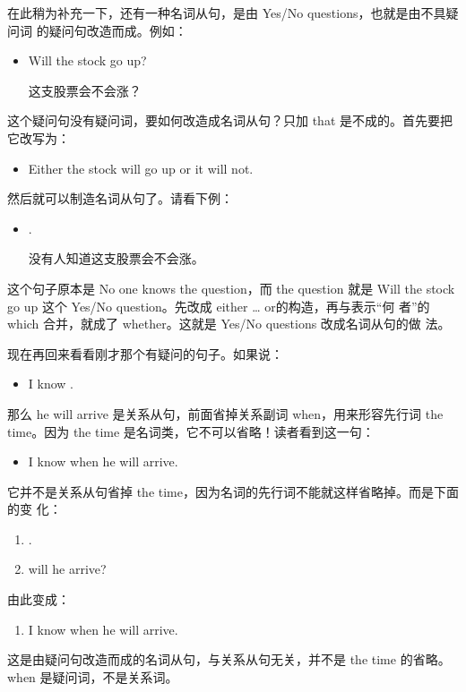 在此稍为补充一下，还有一种名词从句，是由 Yes/No questions，也就是由不具疑问词
的疑问句改造而成。例如：
\begin{itemize}
\item Will the stock go up?

  这支股票会不会涨？
\end{itemize}
这个疑问句没有疑问词，要如何改造成名词从句？只加 that
是不成的。首先要把它改写为：
\begin{itemize}
\item Either the stock will go up or it will not.
\end{itemize}
然后就可以制造名词从句了。请看下例：
\begin{itemize}
\item {}  .

  没有人知道这支股票会不会涨。
\end{itemize}
这个句子原本是 No one knows the question，而 the question 就是 Will the
stock go up 这个 Yes/No question。先改成 either \ldots{} or的构造，再与表示“何
者”的 which 合并，就成了 whether。这就是 Yes/No questions 改成名词从句的做
法。

现在再回来看看刚才那个有疑问的句子。如果说：
\begin{itemize}
\item I know  .
\end{itemize}
那么 he will arrive 是关系从句，前面省掉关系副词 when，用来形容先行词
the time。因为 the time 是名词类，它不可以省略！读者看到这一句：
\begin{itemize}
\item   I know when he will arrive.
\end{itemize}
它并不是关系从句省掉 the time，因为名词的先行词不能就这样省略掉。而是下面的变
化：
\begin{enumerate}
\item {}  .
\item {} will he arrive?
\end{enumerate}

由此变成：
\begin{enumerate}[resume]
\item I know when he will arrive.
\end{enumerate}
这是由疑问句改造而成的名词从句，与关系从句无关，并不是 the time
的省略。when 是疑问词，不是关系词。

